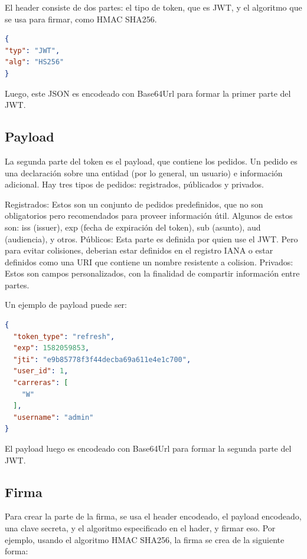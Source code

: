 El header consiste de dos partes: el tipo de token, que es JWT, y el algoritmo que se usa para firmar, como HMAC SHA256.

\begin{lstlisting}[language=json,firstnumber=1]
{
"typ": "JWT",
"alg": "HS256"
}
\end{lstlisting}
Luego, este JSON es encodeado con Base64Url para formar la primer parte del JWT.

\subsection[Payload]{Payload}

La segunda parte del token es el payload, que contiene los pedidos. Un pedido es una declaración sobre una entidad (por lo general, un usuario) e información adicional. Hay tres tipos de pedidos: registrados, públicados y privados.

\begin{outline}
    \1 Registrados: Estos son un conjunto de pedidos predefinidos, que no son obligatorios pero recomendados para proveer información útil. Algunos de estos son: iss (issuer), exp (fecha de expiración del token), sub (asunto), aud (audiencia), y otros.
    \1 Públicos: Esta parte es definida por quien use el JWT. Pero para evitar colisiones, deberian estar definidos en el registro IANA o estar definidos como una URI que contiene un nombre resistente a colision.
    \1 Privados: Estos son campos personalizados, con la finalidad de compartir información entre partes.
\end{outline}

Un ejemplo de payload puede ser: 

\begin{lstlisting}[language=json,firstnumber=1]
{
  "token_type": "refresh",
  "exp": 1582059853,
  "jti": "e9b85778f3f44decba69a611e4e1c700",
  "user_id": 1,
  "carreras": [
    "W"
  ],
  "username": "admin"
}
\end{lstlisting}

El payload luego es encodeado con Base64Url para formar la segunda parte del JWT.

\subsection[Firma]{Firma}

Para crear la parte de la firma, se usa el header encodeado, el payload encodeado, una clave secreta, y el algoritmo especificado en el hader, y firmar eso.
Por ejemplo, usando el algoritmo HMAC SHA256, la firma se crea de la siguiente forma: 

